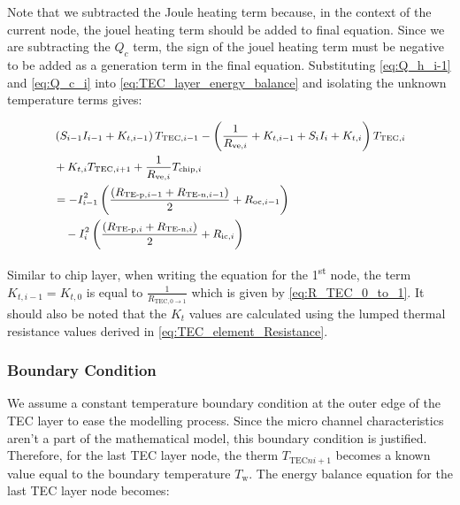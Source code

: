 \documentclass[10pt,a4paper,twocolumn]{article}
\begin{document}
Note that we subtracted the Joule heating term because, in the context of the current node, the jouel heating term should be added to final equation. Since we are subtracting the $Q_c$ term, the sign of the jouel heating term must be negative to be added as a generation term in the final equation.
Substituting \cref{eq:Q_h_i-1} and \cref{eq:Q_c_i} into \cref{eq:TEC_layer_energy_balance} and isolating the unknown temperature terms gives:

\begin{equation}
	\small
	\begin{aligned}
		 & \left(S_{i-1}I_{i-1}+K_{t,i-1}\right)T_{\text{TEC},i-1}-\left(\frac{1}{R_{\text{ve},i}}+K_{t,i-1}+S_{i}I_{i}+K_{t,i} \right)T_{\text{TEC},i} \\ &+K_{t,i}T_{\text{TEC},i+1}
		+\frac{1}{R_{\text{ve},i}}T_{\text{chip},i}                                                                                                     \\ &=-I_{i-1}^2 \left( \frac{(R_{\text{TE-p},i-1}+R_{\text{TE-n},i-1})}{2} + R_{\text{oc},i-1} \right) \\
		 & \quad - I_{i}^2 \left( \frac{(R_{\text{TE-p},i}+R_{\text{TE-n},i})}{2} + R_{\text{ic},i} \right)
	\end{aligned}
\end{equation}

Similar to chip layer, when writing the equation for the 1\textsuperscript{st} node, the term $K_{t,i-1} = K_{t,0}$ is equal to $\frac{1}{R_{\text{TEC}, 0\to 1}}$ which is given by \cref{eq:R_TEC_0_to_1}. It should also be noted that the $K_{t}$ values are calculated using the lumped thermal resistance values derived in \cref{eq:TEC_element_Resistance}.

\subsubsection{Boundary Condition}

We assume a constant temperature boundary condition at the outer edge of the TEC layer to ease the modelling process. Since the micro channel characteristics aren't a part of the mathematical model, this boundary condition is justified. Therefore, for the last TEC layer node, the therm $T_{\text{TEC}ni+1}$ becomes a known value equal to the boundary temperature $T_{\text{w}}$. The energy balance equation for the last TEC layer node becomes:
\end{document}
